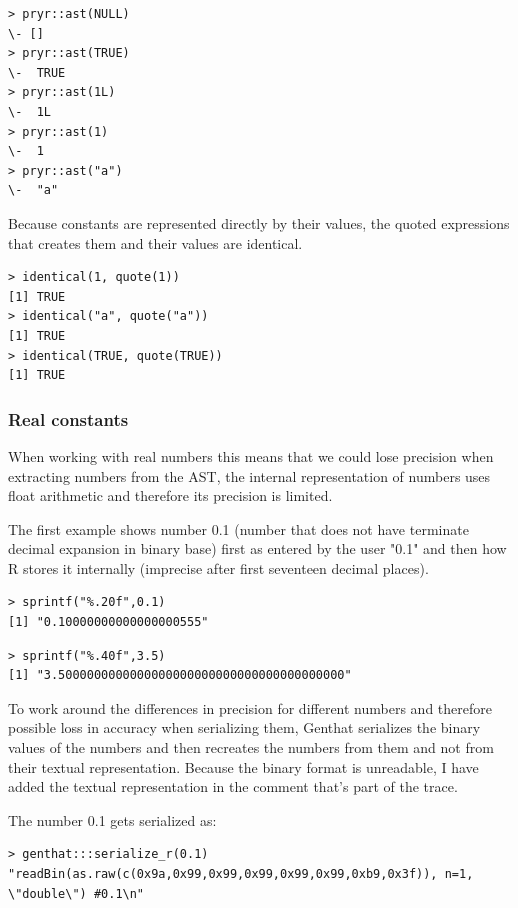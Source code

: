 \documentclass[thesis=B,english]{FITthesis}[2012/10/20]
\begin{document}
\begin{verbatim}
> pryr::ast(NULL)
\- []
> pryr::ast(TRUE)
\-  TRUE
> pryr::ast(1L)
\-  1L
> pryr::ast(1)
\-  1
> pryr::ast("a")
\-  "a"
\end{verbatim}

Because constants are represented directly by their values, the quoted expressions that creates them and their values are identical.

\begin{verbatim}
> identical(1, quote(1))
[1] TRUE
> identical("a", quote("a"))
[1] TRUE
> identical(TRUE, quote(TRUE))
[1] TRUE
\end{verbatim}

\subsubsection{Real constants}
When working with real numbers this means that we could lose precision when extracting numbers from the AST, the internal representation of numbers uses float arithmetic and therefore its precision is limited.

The first example shows number 0.1 (number that does not have terminate decimal expansion in binary base) first as entered by the user "0.1" and then how R stores it internally (imprecise after first seventeen decimal places).

\begin{verbatim}
> sprintf("%.20f",0.1)
[1] "0.10000000000000000555"
\end{verbatim}

\begin{verbatim}
> sprintf("%.40f",3.5)
[1] "3.5000000000000000000000000000000000000000"
\end{verbatim}

To work around the differences in precision for different numbers and therefore possible loss in accuracy when serializing them, Genthat serializes the binary values of the numbers and then recreates the numbers from them and not from their textual representation. Because the binary format is unreadable, I have added the textual representation in the comment that's part of the trace.

The number 0.1 gets serialized as:

\begin{verbatim}
> genthat:::serialize_r(0.1)
"readBin(as.raw(c(0x9a,0x99,0x99,0x99,0x99,0x99,0xb9,0x3f)), n=1, \"double\") #0.1\n"
\end{verbatim}
\end{document}
